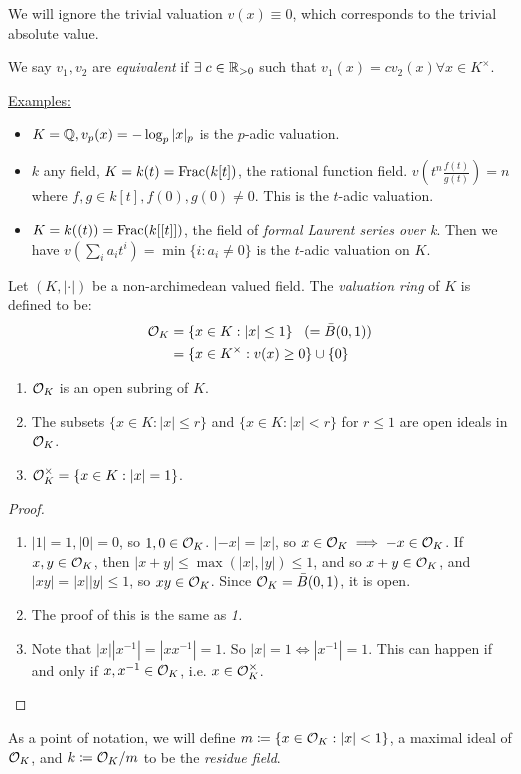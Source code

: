 \documentclass[10pt,a4paper]{article}
\begin{document}
We will ignore the trivial valuation $v(x) \equiv 0$, which corresponds to the trivial absolute value.

We say $v_1, v_2$ are \emph{equivalent} if $\exists c \in \R_{>0}$ such that $v_1(x) = cv_2(x) \forall x \in K^\times$.

\underline{Examples:}
\begin{itemize}
  \item $K = \mathbb{Q}, v_p(x) = -\log_p |x|_p$ is the $p$-adic valuation.
  \item $k$ any field, $K = k(t) = \operatorname{Frac}(k[t])$, the rational function field. $v\left(t^n \frac{f(t)}{g(t)}\right) =n$ where $f, g \in k[t], f(0), g(0) \neq 0$. This is the $t$-adic valuation.
  \item $K = k((t)) = \operatorname{Frac}(k[[t]])$, the field of \emph{formal Laurent series over k}. Then we have $v\left(\sum_i a_i t^i\right) = \min \{i : a_i \neq 0\}$ is the $t$-adic valuation on $K$.
\end{itemize}

\begin{definition}
  Let $(K, |\cdot|)$ be a non-archimedean valued field. The \emph{valuation ring} of $K$ is defined to be:
  \begin{align*}
    \mathcal{O}_K &= \{ x \in K : |x| \leq 1\}\;\;\; (= \bar{B}(0, 1))\\
    &= \{x \in K^\times : v(x) \geq 0\}\cup\{0\}
  \end{align*}
\end{definition}
\begin{proposition}\hspace*{0cm}
  \begin{enumerate}
    \item $\mathcal{O}_K$ is an open subring of $K$.
    \item The subsets $\{x \in K : |x| \leq r\}$ and $\{x \in K : |x| < r\}$ for $r \leq 1$ are open ideals in $\mathcal{O}_K$.
    \item $\mathcal{O}_K^\times = \{x\in K : |x| = 1\}$.
  \end{enumerate}
\end{proposition}
\begin{proof}\hspace*{0cm}
  \begin{enumerate}[label = \textit{\arabic*}.]
    \item $|1| = 1, |0| = 0$, so $1, 0 \in \mathcal{O}_K$. $|-x| = |x|$, so $x \in \mathcal{O}_K \implies -x \in \mathcal{O}_K$. If $x, y \in \mathcal{O}_K$, then $|x+y| \leq \max(|x|, |y|) \leq 1$, and so $x+y \in \mathcal{O}_K$, and $|xy| = |x||y| \leq 1$, so $xy \in \mathcal{O}_K$. Since $\mathcal{O}_K = \bar{B}(0, 1)$, it is open.
    \item The proof of this is the same as \textit{1.}
    \item Note that $|x||x^{-1}| = |xx^{-1}| = 1$. So $|x| = 1 \iff |x^{-1}| = 1$. This can happen if and only if $x, x^{-1} \in \mathcal{O}_K$, i.e. $x \in \mathcal{O}_K^\times$.
  \end{enumerate}
\end{proof}
As a point of notation, we will define $m \coloneqq \{x \in \mathcal{O}_K : |x|<1\}$, a maximal ideal of $\mathcal{O}_K$, and $k \coloneqq \mathcal{O}_K/m$ to be the \emph{residue field}.
\end{document}
